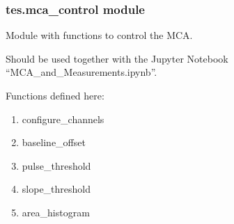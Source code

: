 \documentclass[letterpaper,10pt,english]{sphinxmanual}
\begin{document}
\subsubsection{tes.mca\_control module}
\label{\detokenize{tes:module-tes.mca_control}}\label{\detokenize{tes:tes-mca-control-module}}
\sphinxAtStartPar
Module with functions to control the MCA.

\sphinxAtStartPar
Should be used together with the Jupyter Notebook
“MCA\_and\_Measurements.ipynb”.

\sphinxAtStartPar
Functions defined here:
\begin{enumerate}
%
\item {} 
\sphinxAtStartPar
configure\_channels

\item {} 
\sphinxAtStartPar
baseline\_offset

\item {} 
\sphinxAtStartPar
pulse\_threshold

\item {} 
\sphinxAtStartPar
slope\_threshold

\item {} 
\sphinxAtStartPar
area\_histogram

\end{enumerate}
\end{document}
